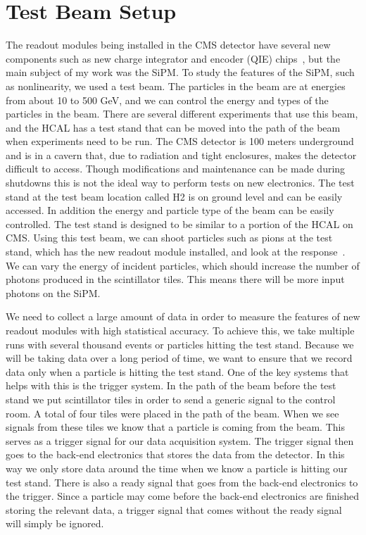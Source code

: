 \section{Test Beam Setup}

The readout modules being installed in the CMS detector have several new components such as new charge integrator and encoder (QIE) chips~\cite{QIE, QIE2}, but the main subject of my work was the SiPM. To study the features of the SiPM, such as nonlinearity, we used a test beam. The particles in the beam are at energies from about 10 to 500 GeV, and we can control the energy and types of the particles in the beam. There are several different experiments that use this beam, and the HCAL has a test stand that can be moved into the path of the beam when experiments need to be run. The CMS detector is 100 meters underground and is in a cavern that, due to radiation and tight enclosures, makes the detector difficult to access. Though modifications and maintenance can be made during shutdowns this is not the ideal way to perform tests on new electronics. The test stand at the test beam location called H2 is on ground level and can be easily accessed. In addition the energy and particle type of the beam can be easily controlled. The test stand is designed to be similar to a portion of the HCAL on CMS. Using this test beam, we can shoot particles such as pions at the test stand, which has the new readout module installed, and look at the response~\cite{TB96, TB06}. We can vary the energy of incident particles, which should increase the number of photons produced in the scintillator tiles. This means there will be more input photons on the SiPM.

We need to collect a large amount of data in order to measure the features of new readout modules with high statistical accuracy. To achieve this, we take multiple runs with several thousand events or particles hitting the test stand. Because we will be taking data over a long period of time, we want to ensure that we record data only when a particle is hitting the test stand. One of the key systems that helps with this is the trigger system. In the path of the beam before the test stand we put scintillator tiles in order to send a generic signal to the control room. A total of four tiles were placed in the path of the beam. When we see signals from these tiles we know that a particle is coming from the beam. This serves as a trigger signal for our data acquisition system. The trigger signal then goes to the back-end electronics that stores the data from the detector. In this way we only store data around the time when we know a particle is hitting our test stand. There is also a ready signal that goes from the back-end electronics to the trigger. Since a particle may come before the back-end electronics are finished storing the relevant data, a trigger signal that comes without the ready signal will simply be ignored.

